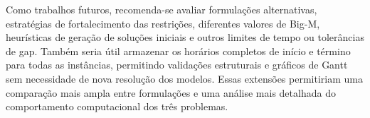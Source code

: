 Como trabalhos futuros, recomenda-se avaliar formulações alternativas,
estratégias de fortalecimento das restrições, diferentes valores de Big-M,
heurísticas de geração de soluções iniciais e outros limites de tempo ou
tolerâncias de gap. Também seria útil armazenar os horários completos de início
e término para todas as instâncias, permitindo validações estruturais e gráficos
de Gantt sem necessidade de nova resolução dos modelos. Essas extensões
permitiriam uma comparação mais ampla entre formulações e uma análise mais
detalhada do comportamento computacional dos três problemas.

